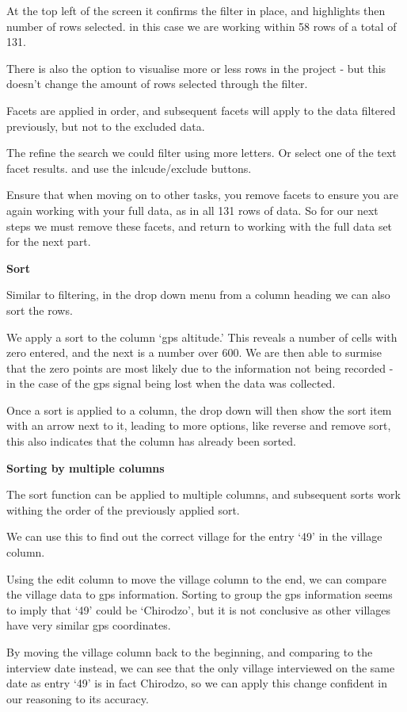 \documentclass{article}
\begin{document}
At the top left of the screen it confirms the filter in place, and highlights then number of rows selected. in this case we are working within 58 rows of a total of 131. 

There is also the option to visualise more or less rows in the project - but this doesn't change the amount of rows selected through the filter. 

Facets are applied in order, and subsequent facets will apply to the data filtered previously, but not to the excluded data.

The refine the search we could filter using more letters. Or select one of the text facet results. and use the inlcude/exclude buttons.

Ensure that when moving on to other tasks, you remove facets to ensure you are again  working with your full data, as in all 131 rows of data. So for our next steps we must remove these facets, and return to working with the full data set for the next part.


\textbf{Sort}

Similar to filtering, in the drop down menu from a column heading we can also sort the rows.

We apply a sort to the column `gps altitude.' This reveals a number of cells with zero entered, and the next is a number over 600. We are then able to surmise that the zero points are most likely due to the information not being recorded - in the case of the gps signal being lost when the data was collected. 

Once a sort is applied to a column, the drop down will then show the sort item with an arrow next to it, leading to more options, like reverse and remove sort, this also indicates that the column has already been sorted. 

\textbf{Sorting by multiple columns}

The sort function can be applied to multiple columns, and subsequent sorts work withing the order of the previously applied sort.

We can use this to find out the correct village for the entry `49' in the village column.

Using the edit column to move the village column to the end, we can compare the village data to gps information. Sorting to group the gps information seems to imply that `49' could be `Chirodzo', but it is not conclusive as other villages have very similar gps coordinates.

By moving the village column back to the beginning, and comparing to the interview date instead, we can see that the only village interviewed on the same date as entry `49' is in fact Chirodzo, so we can apply this change confident in our reasoning to its accuracy.
\end{document}
